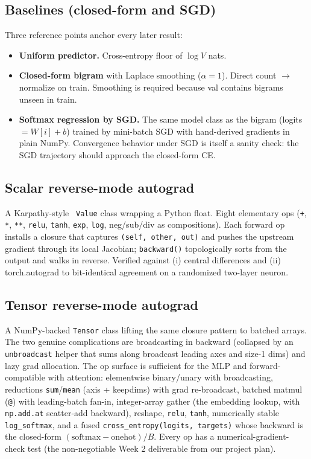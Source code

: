 \documentclass{article}
\begin{document}
\subsection{Baselines (closed-form and SGD)} Three reference points anchor every later result:
\begin{itemize}
\setlength{\itemsep}{0pt}
  \item \textbf{Uniform predictor.} Cross-entropy floor of $\log V$ nats.
  \item \textbf{Closed-form bigram} with Laplace smoothing ($\alpha\!=\!1$). Direct count $\to$ normalize on train. Smoothing is required because val contains bigrams unseen in train.
  \item \textbf{Softmax regression by SGD.} The same model class as the bigram (logits $= W[i] + b$) trained by mini-batch SGD with hand-derived gradients in plain NumPy. Convergence behavior under SGD is itself a sanity check: the SGD trajectory should approach the closed-form CE.
\end{itemize}

\subsection{Scalar reverse-mode autograd} A Karpathy-style~\cite{karpathy2020micrograd} \texttt{Value} class wrapping a Python float. Eight elementary ops (\texttt{+}, \texttt{*}, \texttt{**}, \texttt{relu}, \texttt{tanh}, \texttt{exp}, \texttt{log}, neg/sub/div as compositions). Each forward op installs a closure that captures \texttt{(self, other, out)} and pushes the upstream gradient through its local Jacobian; \texttt{backward()} topologically sorts from the output and walks in reverse. Verified against (i) central differences and (ii) torch.autograd to bit-identical agreement on a randomized two-layer neuron.

\subsection{Tensor reverse-mode autograd} A NumPy-backed \texttt{Tensor} class lifting the same closure pattern to batched arrays. The two genuine complications are broadcasting in backward (collapsed by an \texttt{unbroadcast} helper that sums along broadcast leading axes and size-1 dims) and lazy grad allocation. The op surface is sufficient for the MLP and forward-compatible with attention: elementwise binary/unary with broadcasting, reductions \texttt{sum}/\texttt{mean} (axis + keepdims) with grad re-broadcast, batched matmul (\texttt{@}) with leading-batch fan-in, integer-array gather (the embedding lookup, with \texttt{np.add.at} scatter-add backward), reshape, \texttt{relu}, \texttt{tanh}, numerically stable \texttt{log\_softmax}, and a fused \texttt{cross\_entropy(logits, targets)} whose backward is the closed-form $(\mathrm{softmax}-\text{onehot})/B$. Every op has a numerical-gradient-check test (the non-negotiable Week 2 deliverable from our project plan).
\end{document}
